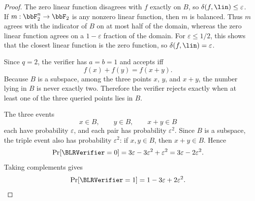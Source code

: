 \begin{proof}
The zero linear function disagrees with $f$ exactly on $B$, so
$\delta(f,\lin)\le\varepsilon$. If $m:\bbF_2^n\to\bbF_2$ is any nonzero linear function,
then $m$ is balanced. Thus $m$ agrees with the indicator of $B$ on at most half of the
domain, whereas the zero linear function agrees on a $1-\varepsilon$ fraction of the domain.
For $\varepsilon\le 1/2$, this shows that the closest linear function is the zero function,
so $\delta(f,\lin)=\varepsilon$.

Since $q=2$, the verifier has $a=b=1$ and accepts iff
\[
    f(x)+f(y)=f(x+y).
\]
Because $B$ is a subspace, among the three points $x$, $y$, and $x+y$, the number lying in
$B$ is never exactly two. Therefore the verifier rejects exactly when at least one of the
three queried points lies in $B$.

The three events
\[
    x\in B,\qquad y\in B,\qquad x+y\in B
\]
each have probability $\varepsilon$, and each pair has probability $\varepsilon^2$.
Since $B$ is a subspace, the triple event also has probability $\varepsilon^2$: if
$x,y\in B$, then $x+y\in B$. Hence
\[
    \Pr[\BLRVerifier=0]
    =
    3\varepsilon-3\varepsilon^2+\varepsilon^2
    =
    3\varepsilon-2\varepsilon^2.
\]
Taking complements gives
\[
    \Pr[\BLRVerifier=1]=1-3\varepsilon+2\varepsilon^2.
\]
\end{proof}
